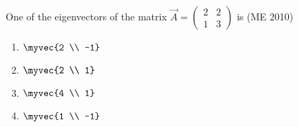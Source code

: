  \item One of the eigenvectors of the matrix
	 \( \vec{A} = \begin{pmatrix} 2 & 2 \\ 1 & 3 \end{pmatrix} \) is
\hfill{(ME 2010)}
\begin{multicols}{4}
\begin{enumerate}
    \item \( \myvec{2 \\ -1} \)
    \item \( \myvec{2 \\ 1} \)
    \item \( \myvec{4 \\ 1} \)
    \item \( \myvec{1 \\ -1} \)
\end{enumerate}
\end{multicols}
